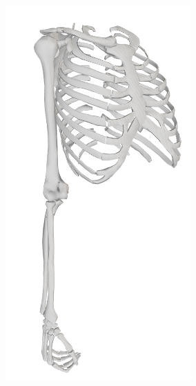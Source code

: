 \begin{figure}[!htb]
    \centering
    \captionsetup{justification=centering}
    \begin{minipage}{0.3\linewidth}
        \centering
        \includegraphics[trim={0 0 0 0}, clip, width=0.6\linewidth]{img/chapter_4/stanford_view.png}
    \end{minipage}
    \hfill
    \begin{minipage}{0.3\linewidth}
        \captionsetup{justification=centering}
        \centering

\end{minipage}
\end{figure}
